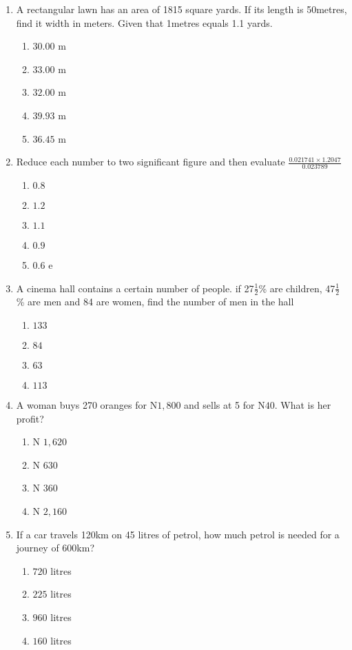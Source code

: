 \begin{multicols}{2}
\begin{enumerate}[label={\arabic*.}]
\begin{enumerate}[label={\Alph*.}]
    \end{enumerate}
\item A rectangular lawn has an area of 1815 square yards. If its length is 50metres, find it width in meters. Given that 1metres equals 1.1 yards.
    \begin{enumerate}[label={\Alph*.}]
    \item \(30.00\) m
    \item \(33.00\) m
    \item \(32.00\) m
    \item \(39.93\) m
    \item \(36.45\) m

    \end{enumerate}
\item Reduce each number to two significant figure and then evaluate \(\frac{0.021741 \times 1.2047}{0.023789}\)
    \begin{enumerate}[label={\Alph*.}]
    \item \(0.8\)
    \item \(1.2\)
    \item \(1.1\)
    \item \(0.9\)
    \item \(0.6\)
e
    \end{enumerate}
\item A cinema hall contains a certain number of people. if 27\(\frac{1}{2}\)\% are children, 47\(\frac{1}{2}\)\% are men and 84 are 
women, find the number of men in the hall
    \begin{enumerate}[label={\Alph*.}]
    \item \(133\)
    \item \(84\)
    \item \(63\)
    \item \(113\)

    \end{enumerate}
\item A woman buys 270 oranges for N\(1,800\) and sells at 5 for N\(40\). What is her profit?
    \begin{enumerate}[label={\Alph*.}]
    \item N \(1,620\)
    \item N \(630\)
    \item N \(360\)
    \item N \(2,160\)
    

    \end{enumerate}
\item If a car travels 120km on 45 litres of petrol, how much petrol is needed for a journey of 600km?
    \begin{enumerate}[label={\Alph*.}]
    \item \(720\) litres
    \item \(225\) litres
    \item \(960\) litres
    \item \(160\) litres



\end{enumerate}
\end{enumerate}
\end{multicols}
